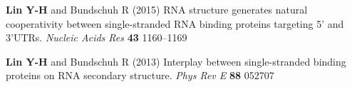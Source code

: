 \documentclass[11pt]{../yhlcv}
\def\tname#1{{\bf #1}}
\begin{document}
\begin{etaremune}[leftmargin=0.26in]
\item 
\tname{Lin Y-H} and Bundschuh R (2015) 
RNA structure generates natural cooperativity between single-stranded RNA binding proteins targeting 5' and 3'UTRs.
{\it Nucleic Acids Res} {\bf 43} 1160--1169

\item 
\tname{Lin Y-H} and Bundschuh R (2013) 
Interplay between single-stranded binding proteins on RNA secondary structure.
{\it Phys Rev E} {\bf 88} 052707

\end{etaremune} 
\end{document}
